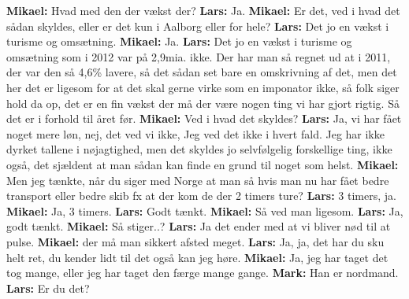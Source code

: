 \textbf{Mikael:} Hvad med den der vækst der? \newline
\textbf{Lars:} Ja. \newline
\textbf{Mikael:} Er det, ved i hvad det sådan skyldes, eller er det kun i Aalborg eller for hele? \newline
\textbf{Lars:} Det jo en vækst i turisme og omsætning. \newline
\textbf{Mikael:} Ja.\newline 
\textbf{Lars:} Det jo en vækst i turisme og omsætning som i 2012 var på 2,9mia. ikke. Der har man så regnet ud at i 2011, der var den så 4,6\% lavere, så det sådan set bare en omskrivning af det, men det her det er ligesom for at det skal gerne virke som en imponator ikke, så folk siger hold da op, det er en fin vækst der må der være nogen ting vi har gjort rigtig. Så det er i forhold til året før. \newline
\textbf{Mikael:} Ved i hvad det skyldes? \newline
\textbf{Lars:} Ja, vi har fået noget mere løn, nej, det ved vi ikke, Jeg ved det ikke i hvert fald. Jeg har ikke dyrket tallene i nøjagtighed, men det skyldes jo selvfølgelig forskellige ting, ikke også, det sjældent at man sådan kan finde en grund til noget som helst. \newline
\textbf{Mikael:} Men jeg tænkte, når du siger med Norge at man så hvis man nu har fået bedre transport eller bedre skib fx at der kom de der 2 timers ture? \newline
\textbf{Lars:} 3 timers, ja. \newline
\textbf{Mikael:} Ja, 3 timers. \newline
\textbf{Lars:} Godt tænkt. \newline
\textbf{Mikael:} Så ved man ligesom.\newline
\textbf{Lars:} Ja, godt tænkt. \newline
\textbf{Mikael:} Så stiger..?\newline
\textbf{Lars:} Ja det ender med at vi bliver nød til at pulse. \newline
\textbf{Mikael:} der må man sikkert afsted meget. \newline
\textbf{Lars:} Ja, ja, det har du sku helt ret, du kender lidt til det også kan jeg høre. \newline
\textbf{Mikael:} Ja, jeg har taget det tog mange, eller jeg har taget den færge mange gange. \newline
\textbf{Mark:} Han er nordmand. \newline
\textbf{Lars:} Er du det? \newline
